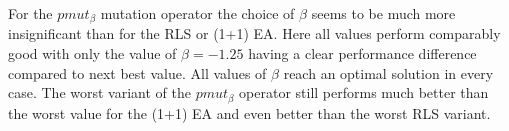 For the $pmut_\beta$ mutation operator the choice of $\beta$ seems to be much more insignificant than for the RLS or (1+1) EA. Here all values perform comparably good with only the value of $\beta = -1.25$ having a clear performance difference compared to next best value. All values of $\beta$ reach an optimal solution in every case. The worst variant of the $pmut_\beta$ operator still performs much better than the worst value for the (1+1) EA and even better than the worst RLS variant.